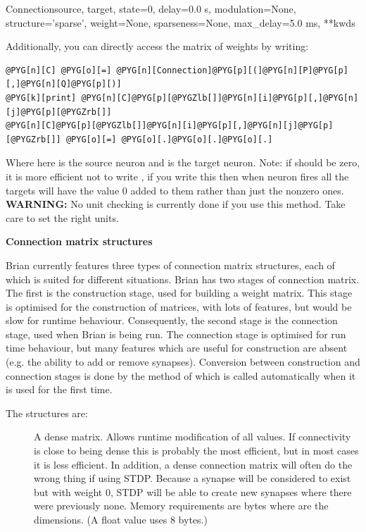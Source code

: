 \documentclass[letterpaper,10pt,english]{manual}
\begin{document}
\begin{classdesc}{Connection}{source, target, state=0, delay=0.0 s, modulation=None, structure='sparse', weight=None, sparseness=None, max\_delay=5.0 ms, **kwds}
\begin{description}
\end{description}

Additionally, you can directly access the matrix of weights by writing:

\begin{Verbatim}[commandchars=@\[\]]
@PYG[n][C] @PYG[o][=] @PYG[n][Connection]@PYG[p][(]@PYG[n][P]@PYG[p][,]@PYG[n][Q]@PYG[p][)]
@PYG[k][print] @PYG[n][C]@PYG[p][@PYGZlb[]]@PYG[n][i]@PYG[p][,]@PYG[n][j]@PYG[p][@PYGZrb[]]
@PYG[n][C]@PYG[p][@PYGZlb[]]@PYG[n][i]@PYG[p][,]@PYG[n][j]@PYG[p][@PYGZrb[]] @PYG[o][=] @PYG[o][.]@PYG[o][.]@PYG[o][.]
\end{Verbatim}

Where here  is the source neuron and  is the target neuron.
Note: if  should be zero, it is more efficient not to write
, if you write this then when neuron  fires all the
targets will have the value 0 added to them rather than just the
nonzero ones.
\textbf{WARNING:} No unit checking is currently done if you use this method.
Take care to set the right units.

\textbf{Connection matrix structures}

Brian currently features three types of connection matrix structures,
each of which is suited for different situations. Brian has two stages
of connection matrix. The first is the construction stage, used for
building a weight matrix. This stage is optimised for the construction
of matrices, with lots of features, but would be slow for runtime
behaviour. Consequently, the second stage is the connection stage,
used when Brian is being run. The connection stage is optimised for
run time behaviour, but many features which are useful for construction
are absent (e.g. the ability to add or remove synapses). Conversion
between construction and connection stages is done by the
 method of \hyperlink{brian.Connection}{} which is called
automatically when it is used for the first time.

The structures are:
\begin{description}
\item[] \leavevmode
A dense matrix. Allows runtime modification of all values. If
connectivity is close to being dense this is probably the most
efficient, but in most cases it is less efficient. In addition,
a dense connection matrix will often do the wrong thing if
using STDP. Because a synapse will be considered to exist but
with weight 0, STDP will be able to create new synapses where
there were previously none. Memory requirements are 
bytes where  are the dimensions. (A  float
value uses 8 bytes.)


\end{description}
\end{classdesc}
\end{document}
